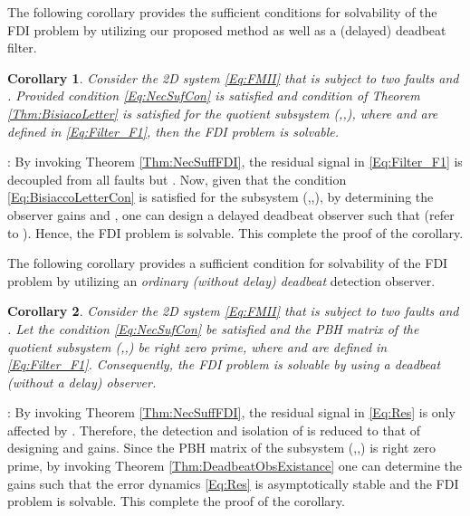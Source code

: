 \documentclass[journal,12pt,draftcls,onecolumn]{IEEEtran}
\def\QEDclosed{\hfill\IEEEQEDclosed}
\renewcommand{\qed}{\QEDclosed}
\renewenvironment{proof}[1][\proofname]{\noindent\nobreakspace{\bfseries #1}:\;}{\qed\par}
\newtheorem{corollary}{Corollary}
\begin{document}
The following corollary provides the sufficient conditions for solvability of the FDI problem by utilizing  our proposed method as well as a (delayed) deadbeat filter.
\begin{corollary}\label{Col:FDI_DelayedDeadBeat_Suff}
	Consider the 2D system \eqref{Eq:FMII} that is subject to two faults  and . Provided condition \eqref{Eq:NecSufCon} is satisfied and  condition of Theorem \ref{Thm:BisiacoLetter} is satisfied for the quotient subsystem (,,), where  and  are defined in \eqref{Eq:Filter_F1}, then  the FDI problem is solvable. \end{corollary}
\begin{proof}
	 By invoking Theorem \ref{Thm:NecSuffFDI},  the residual signal  in \eqref{Eq:Filter_F1} is decoupled from all faults but . Now, given that the condition \eqref{Eq:BisiaccoLetterCon} is satisfied for the subsystem (,,), by determining the observer gains  and , one can  design a delayed deadbeat observer such that  (refer to \cite[Theorem 1]{BisiaccoLetter}). Hence, the FDI problem is solvable. This complete the proof of the corollary.
\end{proof}

The following corollary provides a sufficient condition for solvability of the FDI problem by utilizing  an {\it ordinary (without delay) deadbeat} detection observer.

\begin{corollary}\label{Col:FDI_DeadBeat_Suff}
	Consider the 2D system \eqref{Eq:FMII} that is subject to two faults  and . Let the condition \eqref{Eq:NecSufCon} be satisfied and the PBH matrix of the quotient subsystem (,,) be right zero prime, where  and  are defined in \eqref{Eq:Filter_F1}. Consequently, the FDI problem is solvable by using a deadbeat (without a delay) observer. \end{corollary}
\begin{proof}
	 By invoking Theorem \ref{Thm:NecSuffFDI},  the residual signal in \eqref{Eq:Res} is only affected by . Therefore, the detection and isolation of  is reduced to that of designing  and  gains.  Since the PBH matrix of the subsystem (,,) is right zero prime, by invoking Theorem \ref{Thm:DeadbeatObsExistance} one can determine the gains such that the error dynamics \eqref{Eq:Res} is asymptotically stable and the FDI problem is solvable. This complete the proof of the corollary.
\end{proof}
\end{document}
